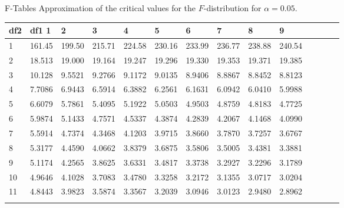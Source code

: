 \begin{frame}{F-Tables}
{\small Approximation of the critical values for the $F$-distribution for $\alpha=0.05$. }
 {
   \fontsize{5pt}{5pt}
   \selectfont
   \begin{tabular}{l|lllllllllllll} 
     df2  & df1      1  &      2  &      3  &      4  &      5  &      6  &      7  &      8  &      9 \\ \hline 
  1 & 161.45 & 199.50 & 215.71 & 224.58 & 230.16 & 233.99 & 236.77 & 238.88 & 240.54 \\[2pt] \arrayrulecolor{light-gray}\hline\arrayrulecolor{black}  
  2 & 18.513 & 19.000 & 19.164 & 19.247 & 19.296 & 19.330 & 19.353 & 19.371 & 19.385 \\[2pt] \arrayrulecolor{light-gray}\hline\arrayrulecolor{black}  
  3 & 10.128 & 9.5521 & 9.2766 & 9.1172 & 9.0135 & 8.9406 & 8.8867 & 8.8452 & 8.8123 \\[2pt] \arrayrulecolor{light-gray}\hline\arrayrulecolor{black}  
  4 & 7.7086 & 6.9443 & 6.5914 & 6.3882 & 6.2561 & 6.1631 & 6.0942 & 6.0410 & 5.9988 \\[2pt] \arrayrulecolor{light-gray}\hline\arrayrulecolor{black}  
  5 & 6.6079 & 5.7861 & 5.4095 & 5.1922 & 5.0503 & 4.9503 & 4.8759 & 4.8183 & 4.7725 \\[2pt] \arrayrulecolor{light-gray}\hline\arrayrulecolor{black}  
  6 & 5.9874 & 5.1433 & 4.7571 & 4.5337 & 4.3874 & 4.2839 & 4.2067 & 4.1468 & 4.0990 \\[2pt] \arrayrulecolor{light-gray}\hline\arrayrulecolor{black}  
  7 & 5.5914 & 4.7374 & 4.3468 & 4.1203 & 3.9715 & 3.8660 & 3.7870 & 3.7257 & 3.6767 \\[2pt] \arrayrulecolor{light-gray}\hline\arrayrulecolor{black}  
  8 & 5.3177 & 4.4590 & 4.0662 & 3.8379 & 3.6875 & 3.5806 & 3.5005 & 3.4381 & 3.3881 \\[2pt] \arrayrulecolor{light-gray}\hline\arrayrulecolor{black}  
  9 & 5.1174 & 4.2565 & 3.8625 & 3.6331 & 3.4817 & 3.3738 & 3.2927 & 3.2296 & 3.1789 \\[2pt] \arrayrulecolor{light-gray}\hline\arrayrulecolor{black}  
 10 & 4.9646 & 4.1028 & 3.7083 & 3.4780 & 3.3258 & 3.2172 & 3.1355 & 3.0717 & 3.0204 \\[2pt] \arrayrulecolor{light-gray}\hline\arrayrulecolor{black}  
 11 & 4.8443 & 3.9823 & 3.5874 & 3.3567 & 3.2039 & 3.0946 & 3.0123 & 2.9480 & 2.8962 \\[2pt] \arrayrulecolor{light-gray}\hline\arrayrulecolor{black}  

\end{tabular}}
\end{frame}
